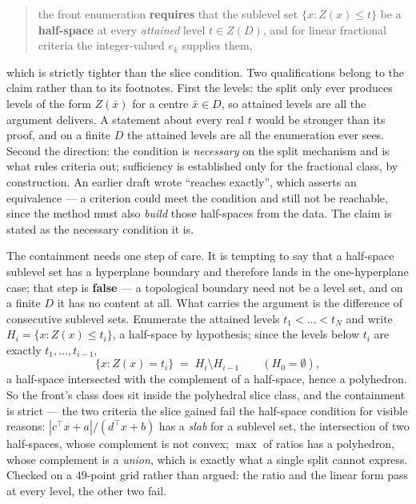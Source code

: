 \documentclass[11pt,a4paper]{article}
\newcommand{\Dset}{D}
\begin{document}
\begin{quote}
the front enumeration \textbf{requires} that the sublevel set
$\{x : Z(x) \leqslant t\}$ be a \textbf{half-space} at every \emph{attained}
level $t \in Z(\Dset)$, and for linear fractional criteria the integer-valued
$e_k$ supplies them,
\end{quote}

\noindent
which is strictly tighter than the slice condition.  Two qualifications belong
to the claim rather than to its footnotes.  First the levels: the split only
ever produces levels of the form $Z(\bar x)$ for a centre $\bar x \in \Dset$,
so attained levels are all the argument delivers.  A statement about every real
$t$ would be stronger than its proof, and on a finite $\Dset$ the attained
levels are all the enumeration ever sees.  Second the direction: the condition
is \emph{necessary} on the split mechanism and is what rules criteria out;
sufficiency is established only for the fractional class, by construction.  An
earlier draft wrote ``reaches exactly'', which asserts an equivalence --- a
criterion could meet the condition and still not be reachable, since the method
must also \emph{build} those half-spaces from the data.  The claim is stated as
the necessary condition it is.

The containment needs one step of care.  It is tempting to say that a
half-space sublevel set has a hyperplane boundary and therefore lands in the
one-hyperplane case; that step is \textbf{false} --- a topological boundary
need not be a level set, and on a finite $\Dset$ it has no content at all.
What carries the argument is the difference of consecutive sublevel sets.
Enumerate the attained levels $t_1 < \dots < t_N$ and write
$H_i = \{x : Z(x) \leqslant t_i\}$, a half-space by hypothesis; since the
levels below $t_i$ are exactly $t_1,\dots,t_{i-1}$,
\[
  \{x : Z(x) = t_i\} \;=\; H_i \setminus H_{i-1} \qquad (H_0 = \emptyset) ,
\]
a half-space intersected with the complement of a half-space, hence a
polyhedron.  So the front's class does sit inside the polyhedral slice class,
and the containment is strict --- the two criteria the slice gained fail the
half-space condition for visible reasons: $|c^{\top}x + a|/(d^{\top}x + b)$ has
a \emph{slab} for a sublevel set, the intersection of two half-spaces, whose
complement is not convex; $\max$ of ratios has a polyhedron, whose complement
is a \emph{union}, which is exactly what a single split cannot express.  Checked on a $49$-point
grid rather than argued: the ratio and the linear form pass at every level, the
other two fail.
\end{document}
